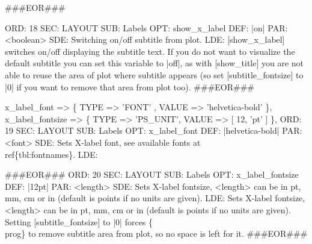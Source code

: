 \documentclass[11pt]{article}
\def\nwendcode{\endtrivlist \endgroup} %
\let\nwdocspar=\par                    %
\begin{document}
###EOR###
\nwendcode{}\nwdocspar
\nwenddocs{}\plusendmoddef
ORD: 18
SEC: LAYOUT
SUB: Labels
OPT: show_x_label
DEF: |on|
PAR: <boolean>
SDE: Switching on/off subtitle from plot.
LDE: 
[show_x_label] switches on/off displaying the subtitle text. 
If you do not want to visualize the default subtitle you can set this
variable to |off|, as with [show_title] you are not able to reuse the area 
of plot where subtitle appears (so set [subtitle_fontsize] to |0| if you 
want to remove that area from plot too).
###EOR###
\nwendcode{}\nwdocspar
\nwenddocs{}\plusendmoddef
x_label_font               => \{ TYPE => 'FONT'   , VALUE => 'helvetica-bold' \},
x_label_fontsize           => \{ TYPE => 'PS_UNIT', VALUE => [ 12, 'pt' ]  \},
\eatline
{}\nwendcode{}\plusendmoddef
ORD: 19
SEC: LAYOUT
SUB: Labels
OPT: x_label_font
DEF: |helvetica-bold|
PAR: <font>
SDE: Sets X-label font, see available fonts at~\\ref\{tbl:fontnames\}.
LDE: 

###EOR###
ORD: 20
SEC: LAYOUT
SUB: Labels
OPT: x_label_fontsize
DEF: |12pt|
PAR: <length>
SDE: Sets X-label fontsize, <length> can be in pt, mm, cm or in (default is points if no units are given).
LDE:
Sets X-label fontsize, <length> can be in pt, mm, cm or in 
(default is points if no units are given).
Setting [subtitle_fontsize] to |0| forces \{\\prog\} to remove
subtitle area from plot, so no space is left for it.
###EOR###
\nwendcode{}\nwdocspar
\end{document}
